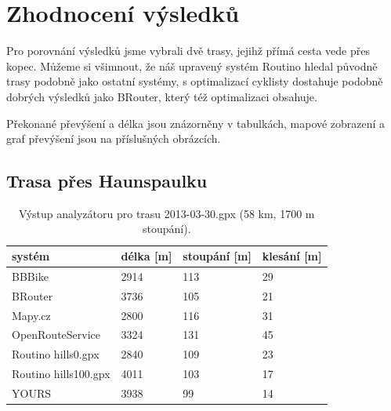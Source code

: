\documentclass[thesis=B,czech]{FITthesis}[2012/06/26]
\begin{document}
\chapter{Zhodnocení výsledků}

Pro porovnání výsledků jsme vybrali dvě trasy, jejihž přímá cesta vede přes kopec. Můžeme si všimnout, že náš upravený systém Routino hledal původně trasy podobně jako ostatní systémy, s optimalizací cyklisty dostahuje podobně dobrých výsledků jako BRouter, který též optimalizaci obsahuje.

Překonané převýšení a délka jsou znázorněny v tabulkách, mapové zobrazení a graf převýšení jsou na příslušných obrázcích.


\section{Trasa přes Haunspaulku}

\begin{table}[h!]
\begin{tabular}{l|l|l|l} %
\textbf{systém}	&	\textbf{délka [m]}	&	\textbf{stoupání [m]}	&	\textbf{klesání [m]}	\\
\hline
BBBike	&	2914 & 113	&	29	 \\
BRouter	&	3736 & 105	&	21	 \\
Mapy.cz	&	2800 & 116	&	31	 \\
OpenRouteService	&	3324 & 131	&	45	 \\
Routino hills0.gpx	&	2840 & 109	&	23	 \\
Routino hills100.gpx	&	4011 & 103	&	17	 \\
YOURS	&	3938 & 99	&	14	 \\
\end{tabular}
\caption{Výstup analyzátoru pro trasu 2013-03-30.gpx (58 km, 1700 m stoupání).}
\label{table:vystupAnalyzatoru}
\end{table}
\end{document}
